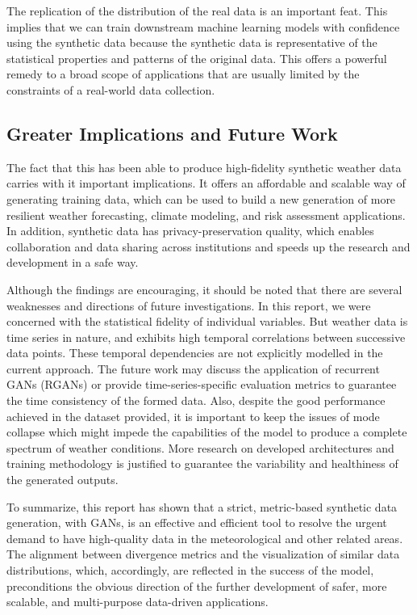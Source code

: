\documentclass[12pt, draftclsnofoot, onecolumn]{IEEEtran}
\begin{document}
The replication of the distribution of the real data is an important feat. This implies that we can train downstream machine learning models with confidence using the synthetic data because the synthetic data is representative of the statistical properties and patterns of the original data. This offers a powerful remedy to a broad scope of applications that are usually limited by the constraints of a real-world data collection.  

\subsection{Greater Implications and Future Work}
The fact that this has been able to produce high-fidelity synthetic weather data carries with it important implications. It offers an affordable and scalable way of generating training data, which can be used to build a new generation of more resilient weather forecasting, climate modeling, and risk assessment applications. In addition, synthetic data has privacy-preservation quality, which enables collaboration and data sharing across institutions and speeds up the research and development in a safe way.  

Although the findings are encouraging, it should be noted that there are several weaknesses and directions of future investigations. In this report, we were concerned with the statistical fidelity of individual variables. But weather data is time series in nature, and exhibits high temporal correlations between successive data points. These temporal dependencies are not explicitly modelled in the current approach. The future work may discuss the application of recurrent GANs (RGANs) or provide time-series-specific evaluation metrics to guarantee the time consistency of the formed data. Also, despite the good performance achieved in the dataset provided, it is important to keep the issues of mode collapse which might impede the capabilities of the model to produce a complete spectrum of weather conditions. More research on developed architectures and training methodology is justified to guarantee the variability and healthiness of the generated outputs.  

To summarize, this report has shown that a strict, metric-based synthetic data generation, with GANs, is an effective and efficient tool to resolve the urgent demand to have high-quality data in the meteorological and other related areas. The alignment between divergence metrics and the visualization of similar data distributions, which, accordingly, are reflected in the success of the model, preconditions the obvious direction of the further development of safer, more scalable, and multi-purpose data-driven applications.  
\end{document}

